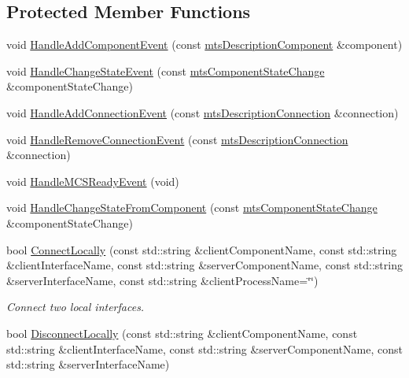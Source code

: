 \subsection*{Protected Member Functions}
\begin{DoxyCompactItemize}
\item 
void \hyperlink{classmts_manager_component_client_a74e843a393f86d5833e4ce3512d761b2}{Handle\+Add\+Component\+Event} (const \hyperlink{classmts_description_component}{mts\+Description\+Component} \&component)
\item 
void \hyperlink{classmts_manager_component_client_a17e48a1d9081a4d62f293787ac37c5b4}{Handle\+Change\+State\+Event} (const \hyperlink{classmts_component_state_change}{mts\+Component\+State\+Change} \&component\+State\+Change)
\item 
void \hyperlink{classmts_manager_component_client_a490ba873a6c3779591f92481c5470af3}{Handle\+Add\+Connection\+Event} (const \hyperlink{classmts_description_connection}{mts\+Description\+Connection} \&connection)
\item 
void \hyperlink{classmts_manager_component_client_afa0aeaa9dbd504c937c7ca945733ee66}{Handle\+Remove\+Connection\+Event} (const \hyperlink{classmts_description_connection}{mts\+Description\+Connection} \&connection)
\item 
void \hyperlink{classmts_manager_component_client_ad271d0982a619c54ae9a2c92bed9b200}{Handle\+M\+C\+S\+Ready\+Event} (void)
\item 
void \hyperlink{classmts_manager_component_client_a63ecbac11f325540b97148984ab9ac54}{Handle\+Change\+State\+From\+Component} (const \hyperlink{classmts_component_state_change}{mts\+Component\+State\+Change} \&component\+State\+Change)
\item 
bool \hyperlink{classmts_manager_component_client_a0dc5f4b41be4b09a845f1c866a6f9ef4}{Connect\+Locally} (const std\+::string \&client\+Component\+Name, const std\+::string \&client\+Interface\+Name, const std\+::string \&server\+Component\+Name, const std\+::string \&server\+Interface\+Name, const std\+::string \&client\+Process\+Name=\char`\"{}\char`\"{})
\begin{DoxyCompactList}\small\item\em Connect two local interfaces. \end{DoxyCompactList}\item 
bool \hyperlink{classmts_manager_component_client_a8f66d717b2e966b375ac848e6661a459}{Disconnect\+Locally} (const std\+::string \&client\+Component\+Name, const std\+::string \&client\+Interface\+Name, const std\+::string \&server\+Component\+Name, const std\+::string \&server\+Interface\+Name)

\end{DoxyCompactItemize}
